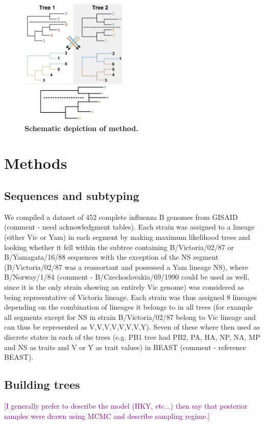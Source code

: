 \documentclass[11pt,oneside,letterpaper]{article}
\def\tbc#1{\textcolor{purple}{[#1]}}
\begin{document}
\begin{figure}[h]
 \centering		
	\includegraphics[width=0.45\textwidth]{figures/TreeFigure2}
	\caption{\textbf{Schematic depiction of method.}}
	\label{methodFig}
\end{figure}

\section*{Methods}

\subsection*{Sequences and subtyping}
We compiled a dataset of 452 complete influenza B genomes from GISAID (comment - need acknowledgment tables). 
Each strain was assigned to a lineage (either Vic or Yam) in each segment by making maximum likelihood trees and looking whether it fell within the subtree containing B/Victoria/02/87 or B/Yamagata/16/88 sequences with the exception of the NS segment (B/Victoria/02/87 was a reassortant and possessed a Yam lineage NS), where B/Norway/1/84 (comment - B/Czechoslovakia/69/1990 could be used as well, since it is the only strain showing an entirely Vic genome) was considered as being representative of Victoria lineage.
Each strain was thus assigned 8 lineages depending on the combination of lineages it belongs to in all trees (for example all segments except for NS in strain B/Victoria/02/87 belong to Vic lineage and can thus be represented as V,V,V,V,V,V,V,Y). 
Seven of these where then used as discrete states in each of the trees (e.g. PB1 tree had PB2, PA, HA, NP, NA, MP and NS as traits and V or Y as trait values) in BEAST (comment - reference BEAST).

\subsection*{Building trees}
\tbc{I generally prefer to describe the model (HKY, etc...) then say that posterior samples were drawn using MCMC and describe sampling regime.}
\end{document}
